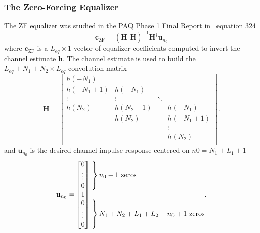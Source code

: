 \subsubsection{The Zero-Forcing Equalizer}
The ZF equalizer was studied in the PAQ Phase 1 Final Report in ~equation 324
\begin{equation}
\mathbf{c}_\text{ZF} = (\mathbf{H}^\dagger \mathbf{H})^{-1} \mathbf{H}^\dagger \mathbf{u}_{n_0}
\label{eq:c_ZF_pinv}
\end{equation}
where $\mathbf{c}_\text{ZF}$ is a $L_{eq} \times 1$ vector of equalizer coefficients computed to invert the channel estimate $\mathbf{h}$.
The channel estimate is used to build the $L_{eq}+N_1+N_2 \times L_{eq}$ convolution matrix
\begin{equation}
\mathbf{H} = 
		\begin{bmatrix}
		h(-N_1)		&  			& 		 	&  			\\
		h(-N_1+1) 	& h(-N_1)	& 		 	&  			\\
		\vdots	 	& \vdots	& \ddots 	&  			\\
		h(N_2)		& h(N_2-1) 	&  			& h(-N_1)  	\\
		 			& h(N_2) 	&  			& h(-N_1+1) \\
		 			&  	   		&  			& \vdots	\\
		 			&  	   		&  			& h(N_2)	\\
	\end{bmatrix}.
\end{equation}
and $\mathbf{u}_{n_0}$ is the desired channel impulse response centered on $n0 = N_1+L_1+1$
\begin{equation}
\mathbf{u}_{n_0} = \begin{bmatrix} 0 \\ \vdots \\ 0 \\ 1 \\ 0 \\ \vdots \\ 0 \end{bmatrix}
	\begin{matrix*}[l] \left. \vphantom{\begin{matrix} 0 \\ \vdots \\ 0 \end{matrix}} \right\}
		\text{$n_0-1$ zeros}
		\\ \\
		\left. \vphantom{\begin{matrix} 0 \\ \vdots \\ 0 \end{matrix}} \right\}
		\text{$N_1+N_2+L_1+L_2-n_0+1$ zeros}
		\end{matrix*}.
\end{equation}
